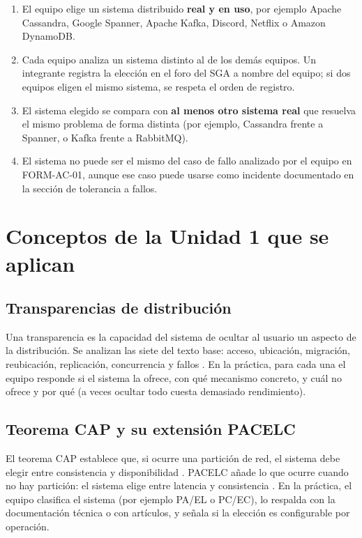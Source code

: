 \documentclass[11pt,a4paper]{article}
\begin{document}
\begin{enumerate}
	\item El equipo elige un sistema distribuido \textbf{real y en uso}, por ejemplo Apache Cassandra, Google Spanner, Apache Kafka, Discord, Netflix o Amazon DynamoDB.
	\item Cada equipo analiza un sistema distinto al de los demás equipos. Un integrante registra la elección en el foro del SGA a nombre del equipo; si dos equipos eligen el mismo sistema, se respeta el orden de registro.
	\item El sistema elegido se compara con \textbf{al menos otro sistema real} que resuelva el mismo problema de forma distinta (por ejemplo, Cassandra frente a Spanner, o Kafka frente a RabbitMQ).
	\item El sistema no puede ser el mismo del caso de fallo analizado por el equipo en FORM-AC-01, aunque ese caso puede usarse como incidente documentado en la sección de tolerancia a fallos.
\end{enumerate}

\section{Conceptos de la Unidad 1 que se aplican}\label{sec:conceptos}

\subsection{Transparencias de distribución}

Una transparencia es la capacidad del sistema de ocultar al usuario un aspecto de la distribución. Se analizan las siete del texto base: acceso, ubicación, migración, reubicación, replicación, concurrencia y fallos \cite{vansteen2023distributed}. En la práctica, para cada una el equipo responde si el sistema la ofrece, con qué mecanismo concreto, y cuál no ofrece y por qué (a veces ocultar todo cuesta demasiado rendimiento).

\subsection{Teorema CAP y su extensión PACELC}

El teorema CAP establece que, si ocurre una partición de red, el sistema debe elegir entre consistencia y disponibilidad \cite{gilbert2002brewer,brewer2012cap}. PACELC añade lo que ocurre cuando no hay partición: el sistema elige entre latencia y consistencia \cite{abadi2012consistency}. En la práctica, el equipo clasifica el sistema (por ejemplo PA/EL o PC/EC), lo respalda con la documentación técnica o con artículos, y señala si la elección es configurable por operación.
\end{document}
